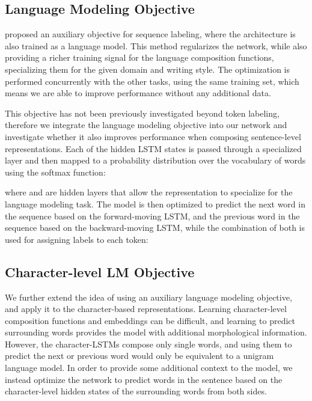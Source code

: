 \documentclass[letterpaper]{article} \usepackage{aaai19}  \usepackage{times}  \usepackage{helvet}  \usepackage{courier}  \usepackage{graphicx}
\begin{document}
\subsection{Language Modeling Objective}

\citet{Rei2017} proposed an auxiliary objective for sequence labeling, where the architecture is also trained as a language model.
This method regularizes the network, while also providing a richer training signal for the language composition functions, specializing them for the given domain and writing style.
The optimization is performed concurrently with the other tasks, using the same training set, which means we are able to improve performance without any additional data.

This objective has not been previously investigated beyond token labeling, therefore we integrate the language modeling objective into our network and investigate whether it also improves performance when composing sentence-level representations. 
Each of the hidden LSTM states is passed through a specialized layer and then mapped to a probability distribution over the vocabulary of words using the softmax function:


\noindent where  and  are hidden layers that allow the representation to specialize for the language modeling task.
The model is then optimized to predict the next word in the sequence based on the forward-moving LSTM, and the previous word in the sequence based on the backward-moving LSTM, while the combination of both is used for assigning labels to each token:


\subsection{Character-level LM Objective}

We further extend the idea of using an auxiliary language modeling objective, and apply it to the character-based representations.
Learning character-level composition functions and embeddings can be difficult, and learning to predict surrounding words provides the model with additional morphological information.
However, the character-LSTMs compose only single words, and using them to predict the next or previous word would only be equivalent to a unigram language model.
In order to provide some additional context to the model, we instead optimize the network to predict words in the sentence based on the character-level hidden states of the surrounding words from both sides.
\end{document}
